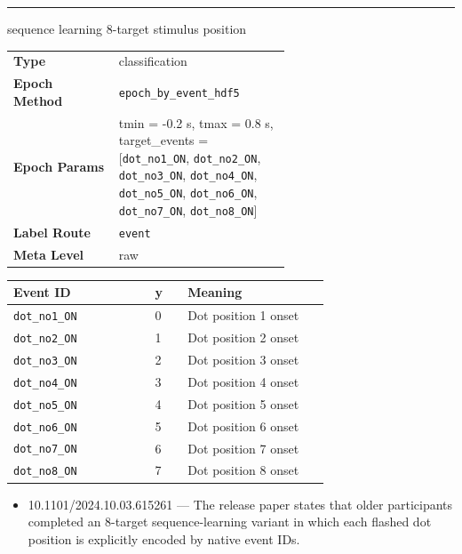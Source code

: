 {\begin{tcolorbox}
\noindent\rule{\linewidth}{0.7pt}\par\nopagebreak
{} {\footnotesize sequence learning 8-target stimulus position}\par\smallskip
{\footnotesize\begin{tabular}{@{}lp{0.62\linewidth}@{}}
\textbf{Type} & classification \\
\textbf{Epoch Method} & \texttt{epoch\_by\_event\_hdf5} \\
\textbf{Epoch Params} & tmin = -0.2 s, tmax = 0.8 s, target\_events = [\texttt{dot\_no1\_ON}, \texttt{dot\_no2\_ON}, \texttt{dot\_no3\_ON}, \texttt{dot\_no4\_ON}, \texttt{dot\_no5\_ON}, \texttt{dot\_no6\_ON}, \texttt{dot\_no7\_ON}, \texttt{dot\_no8\_ON}] \\
\textbf{Label Route} & \texttt{event} \\
\textbf{Meta Level} & raw \\
\end{tabular}}
\par{}\par\smallskip
\begingroup\footnotesize
\begin{tabular}{@{}p{0.3911\linewidth}p{0.0978\linewidth}p{0.3911\linewidth}@{}}
\toprule
\textbf{Event ID} & \textbf{y} & \textbf{Meaning} \\
\midrule
\texttt{dot\_no1\_ON} & 0 & Dot position 1 onset \\
\texttt{dot\_no2\_ON} & 1 & Dot position 2 onset \\
\texttt{dot\_no3\_ON} & 2 & Dot position 3 onset \\
\texttt{dot\_no4\_ON} & 3 & Dot position 4 onset \\
\texttt{dot\_no5\_ON} & 4 & Dot position 5 onset \\
\texttt{dot\_no6\_ON} & 5 & Dot position 6 onset \\
\texttt{dot\_no7\_ON} & 6 & Dot position 7 onset \\
\texttt{dot\_no8\_ON} & 7 & Dot position 8 onset \\
\bottomrule
\end{tabular}
\endgroup
\par{}\par
\begin{itemize}[leftmargin=1.3em,noitemsep,topsep=1pt]
\item[\scriptsize$\cdot$] {\scriptsize 10.1101/2024.10.03.615261 --- The release paper states that older participants completed an 8-target sequence-learning variant in which each flashed dot position is explicitly encoded by native event IDs.}

\end{itemize}
\end{tcolorbox}}
